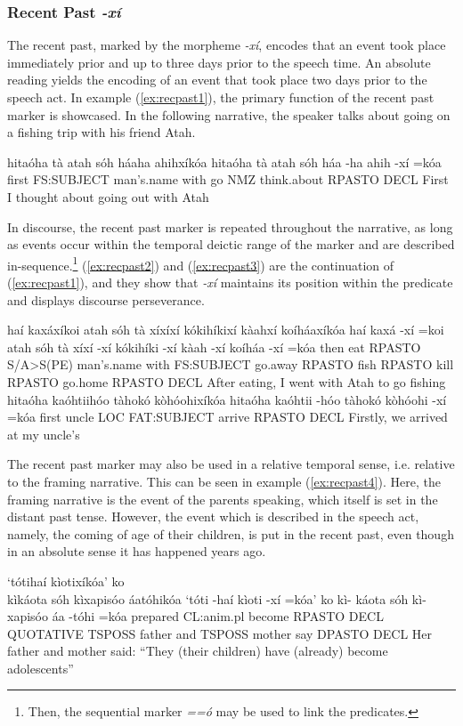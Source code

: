 \documentclass[a4paper, 12pt, oneside]{memoir}
\newcommand{\emh}[1]{\textit{#1}}
\begin{document}
\subsubsection{Recent Past \emh{-xí}}\label{s:recpast}
The recent past, marked by the morpheme \emh{-xí}, encodes that an event took place immediately prior and up to three days prior to the speech time. An absolute reading yields the encoding of an event that took place two days prior to the speech act. In example (\ref{ex:recpast1}), the primary function of the recent past marker is showcased. In the following narrative, the speaker talks about going on a fishing trip with his friend Atah.
\begin{examples}
    \ex \label{ex:recpast1}
    \words hitaóha tà atah sóh háaha ahihxíkóa
    \bits hitaóha tà atah sóh háa -ha ahih -xí =kóa
    \gloss first FS:SUBJECT man's.name with go NMZ think.about RPASTO DECL
    \tr First I thought about going out with Atah
\end{examples}
In discourse, the recent past marker is repeated throughout the narrative, as long as events occur within the temporal deictic range of the marker and are described in-sequence.\footnote{Then, the sequential marker \emh{==ó} may be used to link the predicates.} (\ref{ex:recpast2}) and (\ref{ex:recpast3}) are the continuation of (\ref{ex:recpast1}), and they show that \emh{-xí} maintains its position within the predicate and displays discourse perseverance.
\begin{examples}
    \ex \label{ex:recpast2}
    \words haí kaxáxíkoi atah sóh tà xíxíxí kókihíkixí kàahxí koíháaxíkóa
    \bits haí kaxá -xí =koi atah sóh tà xíxí -xí kókihíki -xí kàah -xí koíháa -xí =kóa  
    \gloss then eat RPASTO \textsc{\textup{S/A>S(PE)}} man's.name with FS:SUBJECT go.away RPASTO fish RPASTO kill RPASTO go.home RPASTO DECL
    \tr After eating, I went with Atah to go fishing
    \ex \label{ex:recpast3}
    \words hitaóha kaóhtiihóo tàhokó kòhóohixíkóa
    \bits hitaóha kaóhtii -hóo tàhokó kòhóohi -xí =kóa 
    \gloss first uncle LOC FAT:SUBJECT arrive RPASTO DECL
    \tr Firstly, we arrived at my uncle's
\end{examples}
The recent past marker may also be used in a relative temporal sense, i.e. relative to the framing narrative. This can be seen in example (\ref{ex:recpast4}). Here, the framing narrative is the event of the parents speaking, which itself is set in the distant past tense. However, the event which is described in the speech act, namely, the coming of age of their children, is put in the recent past, even though in an absolute sense it has happened years ago.
\begin{examples}
    \ex \label{ex:recpast4}
    \words `tótihaí kìotixíkóa' ko \\ kìkáota sóh kìxapisóo áatóhikóa
    \bits `tóti -haí kìoti -xí =kóa' ko kì- káota sóh kì- xapisóo áa -tóhi =kóa
    \gloss prepared CL:anim.pl become RPASTO DECL QUOTATIVE TSPOSS father and TSPOSS mother say DPASTO DECL
    \tr Her father and mother said: ``They (their children) have (already) become adolescents''
\end{examples}
\end{document}
